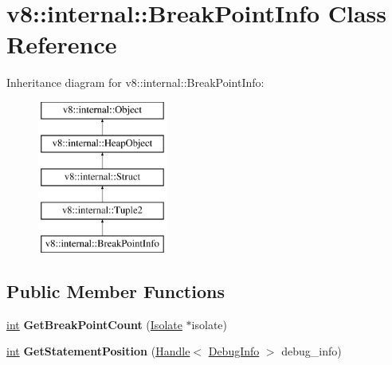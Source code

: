 \hypertarget{classv8_1_1internal_1_1BreakPointInfo}{}\section{v8\+:\+:internal\+:\+:Break\+Point\+Info Class Reference}
\label{classv8_1_1internal_1_1BreakPointInfo}
Inheritance diagram for v8\+:\+:internal\+:\+:Break\+Point\+Info\+:\begin{figure}[H]
\begin{center}
\leavevmode
\includegraphics[height=5.000000cm]{classv8_1_1internal_1_1BreakPointInfo}
\end{center}
\end{figure}
\subsection*{Public Member Functions}
\begin{DoxyCompactItemize}
\item 
\mbox{\label{classv8_1_1internal_1_1BreakPointInfo_a4e1ad067cf8be1737348009813300a15}} 
\mbox{\hyperlink{classint}{int}} {\bfseries Get\+Break\+Point\+Count} (\mbox{\hyperlink{classv8_1_1internal_1_1Isolate}{Isolate}} $\ast$isolate)
\item 
\mbox{\label{classv8_1_1internal_1_1BreakPointInfo_acb52aaaa80520e6678cbb5585162d38d}} 
\mbox{\hyperlink{classint}{int}} {\bfseries Get\+Statement\+Position} (\mbox{\hyperlink{classv8_1_1internal_1_1Handle}{Handle}}$<$ \mbox{\hyperlink{classv8_1_1internal_1_1DebugInfo}{Debug\+Info}} $>$ debug\+\_\+info)
\end{DoxyCompactItemize}
